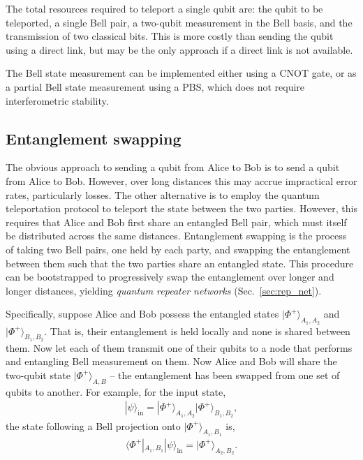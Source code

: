\documentclass[aps,rmp,twocolumn,amsmath,amssymb,nofootinbib,superscriptaddress]{revtex4}
\newcommand{\bra}[1]{\langle#1|}
\newcommand{\ket}[1]{|#1\rangle}
\begin{document}
The total resources required to teleport a single qubit are: the qubit to be teleported, a single Bell pair, a two-qubit measurement in the Bell basis, and the transmission of two classical bits. This is more costly than sending the qubit using a direct link, but may be the only approach if a direct link is not available.

The Bell state measurement can be implemented either using a CNOT gate, or as a partial Bell state measurement using a PBS, which does not require interferometric stability.

%
%

\subsection{Entanglement swapping} \label{sec:repeater}

The obvious approach to sending a qubit from Alice to Bob is to send a qubit from Alice to Bob. However, over long distances this may accrue impractical error rates, particularly losses. The other alternative is to employ the quantum teleportation protocol to teleport the state between the two parties. However, this requires that Alice and Bob first share an entangled Bell pair, which must itself be distributed across the same distances. Entanglement swapping is the process of taking two Bell pairs, one held by each party, and swapping the entanglement between them such that the two parties share an entangled state. This procedure can be bootstrapped to progressively swap the entanglement over longer and longer distances, yielding \emph{quantum repeater networks} (Sec.~\ref{sec:rep_net}).

Specifically, suppose Alice and Bob possess the entangled states $\ket{\Phi^+}_{A_1,A_2}$ and $\ket{\Phi^+}_{B_1,B_2}$. That is, their entanglement is held locally and none is shared between them. Now let each of them transmit one of their qubits to a node that performs and entangling Bell measurement on them. Now Alice and Bob will share the two-qubit state $\ket{\Phi^+}_{A,B}$ -- the entanglement has been swapped from one set of qubits to another. For example, for the input state,
\begin{align}
\ket\psi_\mathrm{in} = \ket{\Phi^+}_{A_1,A_2} \ket{\Phi^+}_{B_1,B_2},
\end{align}
the state following a Bell projection onto $\ket{\Phi^+}_{A_1,B_1}$ is,
\begin{align}
\bra{\Phi^+}_{A_1,B_1} \ket\psi_\mathrm{in} = \ket{\Phi^+}_{A_2,B_2}.
\end{align}
\end{document}
